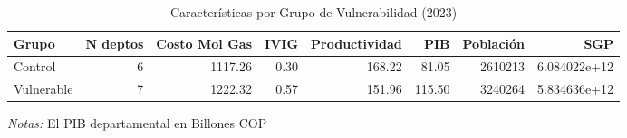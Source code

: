 \documentclass[12pt]{article}
\begin{document}
\setcounter{table}{4}
\begin{table}[htbp]
\centering
\begin{threeparttable}

\caption{Características por Grupo de Vulnerabilidad (2023)}
\begin{tabular}[t]{lrrrrrrr}
\toprule
Grupo & N deptos & Costo Mol Gas & IVIG & Productividad & PIB & Población & SGP\\
\midrule
Control & 6 & 1117.26 & 0.30 & 168.22 & 81.05 & 2610213 & 6.084022e+12\\
Vulnerable & 7 & 1222.32 & 0.57 & 151.96 & 115.50 & 3240264 & 5.834636e+12\\
\bottomrule
\end{tabular}
\begin{tablenotes}
\footnotesize
\item \textit{Notas:} El PIB departamental en Billones COP
\end{tablenotes}
\end{threeparttable}
\end{table}
\end{document}
